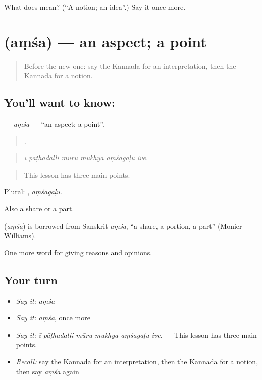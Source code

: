 \begin{tcolorbox}[breakable,colback=teal!4,colframe=teal!35!black,title={Before you move on}]
What does  mean? (\textquotedblleft{}A notion; an idea\textquotedblright{}.) Say it once more.
\end{tcolorbox}
\section[\texorpdfstring{\kn{ಅಂಶ} (aṃśa)}{ಅಂಶ (aṃśa)}]{ (aṃśa) — an aspect; a point}

\label{lesson:KA-C384-amsa}



\begin{quote}
Before the new one: say the Kannada for an interpretation, then the Kannada for a notion.
\end{quote}

\subsection*{You'll want to know: }
\textbf{} — \emph{aṃśa} — \textquotedblleft{}an aspect; a point\textquotedblright{}.

\begin{quote}
     .
\end{quote}

\begin{quote}
\emph{ī pāṭhadalli mūru mukhya aṃśagaḷu ive.}
\end{quote}

\begin{quote}
This lesson has three main points.
\end{quote}

Plural: , \emph{aṃśagaḷu}.

Also a share or a part.

\begin{cousinweb}
\textbf{} (\emph{aṃśa}) is borrowed from Sanskrit \emph{aṃśa}, \textquotedblleft{}a share, a portion, a part\textquotedblright{} (Monier-Williams).
\end{cousinweb}

\begin{grammarlens}[title={What you've built}]
One more word for giving reasons and opinions.
\end{grammarlens}

\subsection*{Your turn}
\begin{itemize}
\raggedright
  \item \emph{Say it:} \emph{aṃśa}
  \item \emph{Say it:} \emph{aṃśa}, once more
  \item \emph{Say it:} \emph{ī pāṭhadalli mūru mukhya aṃśagaḷu ive.} — This lesson has three main points.
  \item \emph{Recall:} say the Kannada for an interpretation, then the Kannada for a notion, then say \emph{aṃśa} again
\end{itemize}

